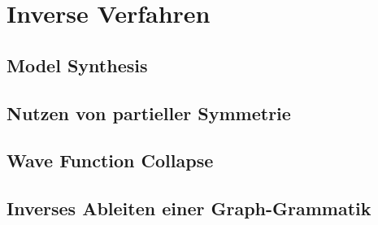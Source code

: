 \section{Inverse Verfahren}
\subsection{Model Synthesis}
\subsection{Nutzen von partieller Symmetrie}
\subsection{Wave Function Collapse}
\subsection{Inverses Ableiten einer Graph-Grammatik}

